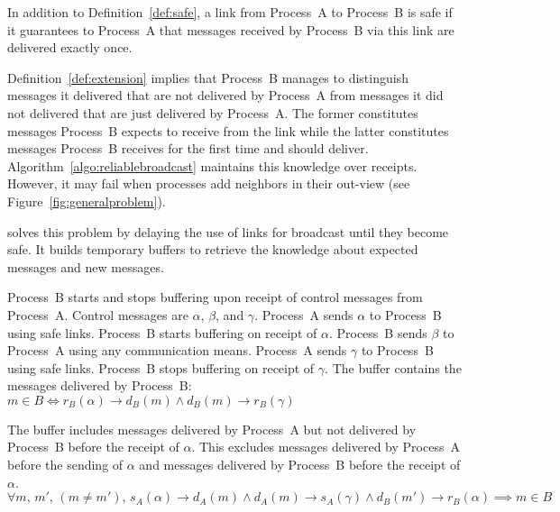 \begin{definition}
  In addition to Definition~\ref{def:safe}, a link from Process~A to Process~B
  is safe if it guarantees to Process~A that messages received by Process~B via
  this link are delivered exactly once.
\end{definition}

Definition~\ref{def:extension} implies that Process~B manages to distinguish
messages it delivered that are not delivered by Process~A from messages it did
not delivered that are just delivered by Process~A. The former constitutes
messages Process~B expects to receive from the link while the latter constitutes
messages Process~B receives for the first time and should
deliver. Algorithm~\ref{algo:reliablebroadcast} maintains this knowledge over
receipts. However, it may fail when processes add neighbors in their out-view
(see Figure~\ref{fig:generalproblem}).

\RPCBROADCAST solves this problem by delaying the use of links for broadcast
until they become safe. It builds temporary buffers to retrieve the knowledge
about expected messages and new messages.

\begin{definition}
  Process~B starts and stops buffering upon receipt of control messages from
  Process~A. Control messages are $\alpha$, $\beta$, and $\gamma$. Process~A
  sends $\alpha$ to Process~B using safe links. Process~B starts buffering on
  receipt of $\alpha$. Process~B sends $\beta$ to Process~A using any
  communication means. Process~A sends $\gamma$ to Process~B using safe
  links. Process~B stops buffering on receipt of $\gamma$.
  The buffer contains the messages delivered by Process~B: \\
  $m \in B \Longleftrightarrow 
  r_B(\alpha) \rightarrow d_B(m) \wedge d_B(m) \rightarrow r_B(\gamma)$
\end{definition}

\begin{lemma}
  The buffer includes messages delivered by Process~A but not delivered by
  Process~B before the receipt of $\alpha$. This excludes messages delivered by
  Process~A before the sending of $\alpha$ and messages delivered by Process~B
  before the receipt of $\alpha$.\\
  $\forall m,\,m',\,(m\neq m'),\,
  s_A(\alpha) \rightarrow d_A(m) \wedge
  d_A(m) \rightarrow s_A(\gamma) \wedge
  d_B(m') \rightarrow r_B(\alpha) \implies m \in B$
\end{lemma}

